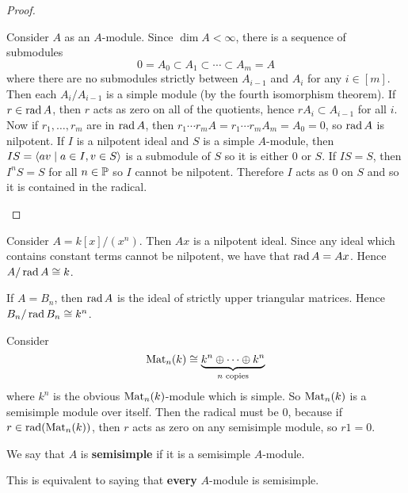 \begin{proof}
	\begin{enum}
		\io
        Consider $A$ as an $A$-module.
        Since $\dim A < \infty$, there is a sequence of submodules
        \[0 = A_0 \subset A_1 \subset \cdots \subset A_m = A\]
        where there are no submodules strictly between $A_{i-1}$ and $A_i$ for any $i \in [m]$.
        Then each $A_i/A_{i-1}$ is a simple module (by the fourth isomorphism theorem).
        If $r \in \operatorname{rad} A$, then $r$ acts as zero on all of the quotients, hence $rA_i \subset A_{i-1}$ for all $i$.
        Now if $r_1,\ldots,r_m$ are in $\operatorname{rad} A$, then $r_1 \cdots r_m A = r_1 \cdots r_m A_m = A_0 = 0$, so $\operatorname{rad} A$ is nilpotent.
        \io
        If $I$ is a nilpotent ideal and $S$ is a simple $A$-module, then $IS = {\left\langle av \mid a \in I, v \in S \right\rangle}$ is a submodule of $S$ so it is either $0$ or $S$.
        If $IS=S$, then $I^nS=S$ for all $n \in \mathbb{P}$ so $I$ cannot be nilpotent.
        Therefore $I$ acts as 0 on $S$ and so it is contained in the radical.
        \qedhere
	\end{enum}
\end{proof}

\begin{exam}
	\begin{enum}
    	\io
		Consider $A = k[x]/(x^n)$.
    	Then $Ax$ is a nilpotent ideal.
    	Since any ideal which contains constant terms cannot be nilpotent, we have that $\operatorname{rad} A = Ax$.
        Hence $A/\operatorname{rad} A \cong k$.
        
        \io
        If $A=B_n$, then $\operatorname{rad} A$ is the ideal of strictly upper triangular matrices.
        Hence $B_n/\operatorname{rad} B_n \cong k^n$.
        
        \io
        Consider
        \[\operatorname{Mat}_n(k) \cong \underbrace{k^n \oplus \cdots \oplus k^n}_{n\text{ copies}}\]
        where $k^n$ is the obvious $\operatorname{Mat}_n(k)$-module which is simple.
        So $\operatorname{Mat}_n(k)$ is a semisimple module over itself.
        Then the radical must be 0, because if $r \in \operatorname{rad}(\operatorname{Mat}_n(k))$, then $r$ acts as zero on any semisimple module, so $r1=0$.
	\end{enum}
\end{exam}

\begin{defn}
	We say that $A$ is \textbf{semisimple} if it is a semisimple $A$-module.
\end{defn}

\begin{prop}
	This is equivalent to saying that \textbf{every} $A$-module is semisimple.
\end{prop}


